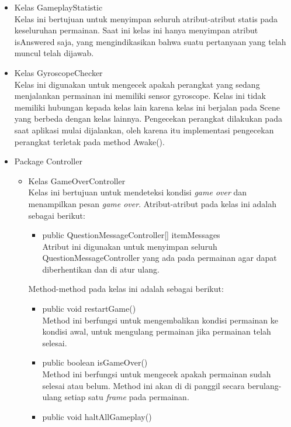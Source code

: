 \begin{itemize}
    \item Kelas GameplayStatistic\\
    Kelas ini bertujuan untuk menyimpan seluruh atribut-atribut statis pada keseluruhan permainan. Saat ini kelas ini hanya menyimpan atribut isAnswered saja, yang mengindikasikan bahwa suatu pertanyaan yang telah muncul telah dijawab. 
    \item Kelas GyroscopeChecker\\
    Kelas ini digunakan untuk mengecek apakah perangkat yang sedang menjalankan permainan ini memiliki sensor gyroscope. Kelas ini tidak memiliki hubungan kepada kelas lain karena kelas ini berjalan pada Scene yang berbeda dengan kelas lainnya. Pengecekan perangkat dilakukan pada saat aplikasi mulai dijalankan, oleh karena itu implementasi pengecekan perangkat terletak pada method Awake().
    \item Package Controller
    \begin{itemize}
        \item Kelas GameOverController\\
        Kelas ini bertujuan untuk mendeteksi kondisi \textit{game over} dan menampilkan pesan \textit{game over}.
        Atribut-atribut pada kelas ini adalah sebagai berikut:
        \begin{itemize}
            \item public QuestionMessageController[] itemMessages\\
            Atribut ini digunakan untuk menyimpan seluruh QuestionMessageController yang ada pada permainan agar dapat diberhentikan dan di atur ulang.
        \end{itemize}
        Method-method pada kelas ini adalah sebagai berikut:
        \begin{itemize}
            \item public void restartGame()\\
            Method ini berfungsi untuk mengembalikan kondisi permainan ke kondisi awal, untuk mengulang permainan jika permainan telah selesai.
            \item public boolean isGameOver()\\
            Method ini berfungsi untuk mengecek apakah permainan sudah selesai atau belum. Method ini akan di di panggil secara berulang-ulang setiap satu \textit{frame} pada permainan.
            \item public void haltAllGameplay()\\

\end{itemize}
\end{itemize}
\end{itemize}
